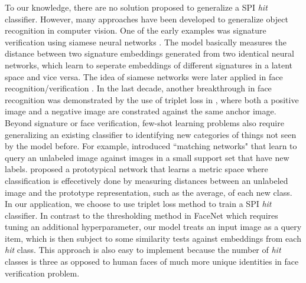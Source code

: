 To our knowledge, there are no solution proposed to generalize a SPI \textit{hit}
classifier.  However, many approaches have been developed to generalize object
recognition in computer vision.  One of the early examples was signature
verification using siamese neural networks
\cite{bromleySignatureVerificationUsing1994}.  The model basically measures the
distance between two signature embeddings generated from two identical neural
networks, which learn to seperate embeddings of different signatures in a latent
space and vice versa.  The idea of siamese networks were later applied in face
recognition/verification \cite{chopraLearningSimilarityMetric2005}.  In the last
decade, another breakthrough in face recognition was demonstrated by the use of
triplet loss in \cite{kochSiameseNeuralNetworks2015a}, where both a positive
image and a negative image are constrated against the same anchor image.  Beyond
signature or face verification, few-shot learning problems also require
generalizing an existing classifier to identifying new categories of things not
seen by the model before.  For example, \cite{vinyalsMatchingNetworksOne2017}
introduced ``matching networks" that learn to query an unlabeled image against
images in a small support set that have new labels.
\cite{snellPrototypicalNetworksFewshot2017} proposed a prototypical network that
learns a metric space where classification is effecetively done by measuring
distances between an unlabeled image and the prototype representation, such as
the average, of each new class.  In our application, we choose to use triplet
loss method to train a SPI \textit{hit} classifier.  In contrast to the
thresholding method in FaceNet which requires tuning an additional
hyperparameter, our model treats an input image as a query item, which is then
subject to some similarity tests against embeddings from each \textit{hit}
class.  This approach is also easy to implement because the number of
\textit{hit} classes is three as opposed to human faces of much more unique
identities in face verification problem.  
